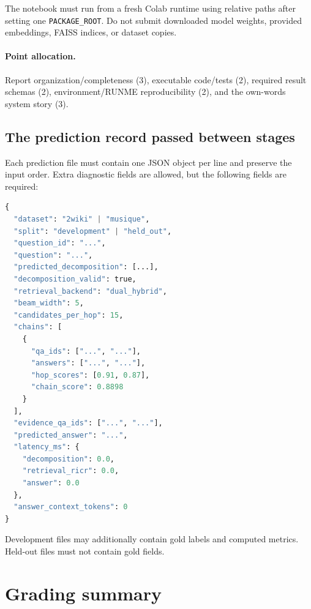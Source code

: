 \documentclass[11pt]{article}
\newcommand{\code}[1]{\texttt{#1}}
\newcommand{\grading}{\paragraph{Point allocation.}}
\begin{document}
The notebook must run from a fresh Colab runtime using relative paths after
setting one \code{PACKAGE\_ROOT}. Do not submit downloaded model weights,
provided embeddings, FAISS indices, or dataset copies.

\grading Report organization/completeness (3), executable code/tests (2),
required result schemas (2), environment/RUNME reproducibility (2), and the
own-words system story (3).

\subsection{The prediction record passed between stages}

Each prediction file must contain one JSON object per line and preserve the
input order. Extra diagnostic fields are allowed, but the following fields are
required:

\begin{lstlisting}[language=Python]
{
  "dataset": "2wiki" | "musique",
  "split": "development" | "held_out",
  "question_id": "...",
  "question": "...",
  "predicted_decomposition": [...],
  "decomposition_valid": true,
  "retrieval_backend": "dual_hybrid",
  "beam_width": 5,
  "candidates_per_hop": 15,
  "chains": [
    {
      "qa_ids": ["...", "..."],
      "answers": ["...", "..."],
      "hop_scores": [0.91, 0.87],
      "chain_score": 0.8898
    }
  ],
  "evidence_qa_ids": ["...", "..."],
  "predicted_answer": "...",
  "latency_ms": {
    "decomposition": 0.0,
    "retrieval_ricr": 0.0,
    "answer": 0.0
  },
  "answer_context_tokens": 0
}
\end{lstlisting}

Development files may additionally contain gold labels and computed metrics.
Held-out files must not contain gold fields.

\section{Grading summary}
\end{document}

